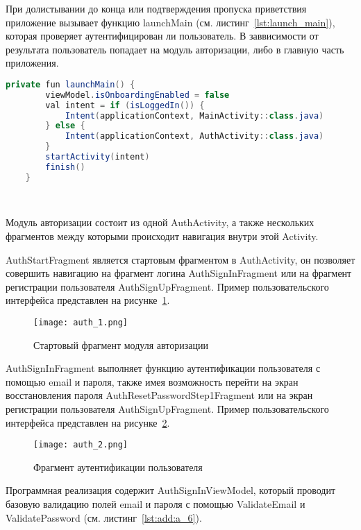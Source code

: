 При долистывании до конца или подтверждения пропуска приветствия приложение вызывает функцию launchMain (см. листинг~\ref{lst:launch_main}), которая проверяет аутентифицирован ли пользователь. В заввисимости от результата пользователь попадает на модуль авторизации, либо в главную часть приложения.

\begin{lstlisting}[language=Java,label={lst:launch_main},caption={Функция launchMain}]
    private fun launchMain() {
        viewModel.isOnboardingEnabled = false
        val intent = if (isLoggedIn()) {
            Intent(applicationContext, MainActivity::class.java)
        } else {
            Intent(applicationContext, AuthActivity::class.java)
        }
        startActivity(intent)
        finish()
    }
\end{lstlisting}


~\par

Модуль авторизации состоит из одной AuthActivity, а также нескольких фрагментов между которыми происходит навигация внутри этой Activity.

AuthStartFragment является стартовым фрагментом в AuthActivity, он позволяет совершить навигацию на фрагмент логина AuthSignInFragment или на фрагмент регистрации пользователя AuthSignUpFragment. Пример пользовательского интерфейса представлен на рисунке~\ref{fig:arch:auth_1}.

\begin{figure}[H]
 \centering
   \texttt{[image: auth\_1.png]} 
   \caption{Стартовый фрагмент модуля авторизации}
   \label{fig:arch:auth_1}
\end{figure}

AuthSignInFragment выполняет функцию аутентификации пользователя с помощью email и пароля, также имея возможность перейти на экран восстановления пароля AuthResetPasswordStep1Fragment или на экран регистрации пользователя AuthSignUpFragment. Пример пользовательского интерфейса представлен на рисунке~\ref{fig:arch:auth_2}.

\begin{figure}[H]
 \centering
   \texttt{[image: auth\_2.png]} 
   \caption{Фрагмент аутентификации пользователя}
   \label{fig:arch:auth_2}
\end{figure}

Программная реализация содержит AuthSignInViewModel, который проводит базовую валидацию полей email и пароля с помощью ValidateEmail и ValidatePassword (см. листинг~\ref{lst:add:a_6}).

